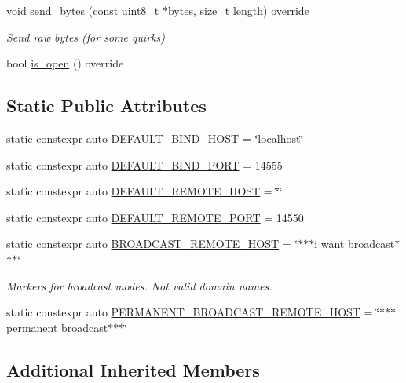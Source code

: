 \begin{DoxyCompactItemize}
void \mbox{\hyperlink{group__mavconn_ga7a1a56365cb5355da86a6a6e2bb4bc8e}{send\+\_\+bytes}} (const uint8\+\_\+t $\ast$bytes, size\+\_\+t length) override
\begin{DoxyCompactList}\small\item\em Send raw bytes (for some quirks) \end{DoxyCompactList}\item 
bool \mbox{\hyperlink{group__mavconn_ga496ff8d6806b35c993740cc05727f59c}{is\+\_\+open}} () override
\end{DoxyCompactItemize}
\subsection*{Static Public Attributes}
\begin{DoxyCompactItemize}
\item 
static constexpr auto \mbox{\hyperlink{group__mavconn_ga62467db7651e86bb5428c4288356f813}{D\+E\+F\+A\+U\+L\+T\+\_\+\+B\+I\+N\+D\+\_\+\+H\+O\+ST}} = \char`\"{}localhost\char`\"{}
\item 
static constexpr auto \mbox{\hyperlink{group__mavconn_ga330f03ed06a3e027ec7be74426dc646b}{D\+E\+F\+A\+U\+L\+T\+\_\+\+B\+I\+N\+D\+\_\+\+P\+O\+RT}} = 14555
\item 
static constexpr auto \mbox{\hyperlink{group__mavconn_ga7a03f4b69e2791a742717516b6421466}{D\+E\+F\+A\+U\+L\+T\+\_\+\+R\+E\+M\+O\+T\+E\+\_\+\+H\+O\+ST}} = \char`\"{}\char`\"{}
\item 
static constexpr auto \mbox{\hyperlink{group__mavconn_ga25daeb4235691fdf52da1551bf93bc88}{D\+E\+F\+A\+U\+L\+T\+\_\+\+R\+E\+M\+O\+T\+E\+\_\+\+P\+O\+RT}} = 14550
\item 
static constexpr auto \mbox{\hyperlink{group__mavconn_gae78adaaf99172a7aafead43dc2883cec}{B\+R\+O\+A\+D\+C\+A\+S\+T\+\_\+\+R\+E\+M\+O\+T\+E\+\_\+\+H\+O\+ST}} = \char`\"{}$\ast$$\ast$$\ast$i want broadcast$\ast$$\ast$$\ast$\char`\"{}
\begin{DoxyCompactList}\small\item\em Markers for broadcast modes. Not valid domain names. \end{DoxyCompactList}\item 
static constexpr auto \mbox{\hyperlink{group__mavconn_gab9cc9895e36eefd3cd6e6fc7d4895c6f}{P\+E\+R\+M\+A\+N\+E\+N\+T\+\_\+\+B\+R\+O\+A\+D\+C\+A\+S\+T\+\_\+\+R\+E\+M\+O\+T\+E\+\_\+\+H\+O\+ST}} = \char`\"{}$\ast$$\ast$$\ast$permanent broadcast$\ast$$\ast$$\ast$\char`\"{}
\end{DoxyCompactItemize}
\subsection*{Additional Inherited Members}


